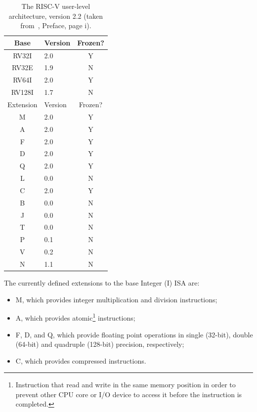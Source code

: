 \begin{table}[!htb]
\renewcommand{\arraystretch}{1.2} %
\caption{The RISC-V user-level architecture, version 2.2 (taken from~\cite{bib:riscvmanual}, Preface, page i).}
	\centering
	\small
	\begin{tabular}{clc}
		\toprule
		Base     & Version & Frozen? \\
		\midrule
		RV32I    & 2.0 & Y \\
		RV32E    & 1.9 & N \\
		RV64I    & 2.0 & Y \\
		RV128I   & 1.7 & N \\
		\midrule
		Extension & Version & Frozen? \\
		\midrule
		M        & 2.0 & Y \\
		A        & 2.0 & Y \\
		F        & 2.0 & Y \\
		D        & 2.0 & Y \\
		Q        & 2.0 & Y \\
		L        & 0.0 & N \\
		C        & 2.0 & Y \\
		B        & 0.0 & N \\
		J        & 0.0 & N \\
		T        & 0.0 & N \\
		P        & 0.1 & N \\
		V        & 0.2 & N \\
		N        & 1.1 & N \\
		\bottomrule
	\end{tabular}
	\label{table:isa}
\end{table}

The currently defined extensions to the base Integer (I) ISA are:

\begin{itemize}
\item M, which provides integer multiplication and division instructions;
\item A, which provides atomic\footnote{Instruction that read and write in the
  same memory position in order to prevent other CPU core or I/O device to
  access it before the instruction is completed.} instructions;
\item F, D, and Q, which provide floating point operations in single (32-bit),
  double (64-bit) and quadruple (128-bit) precision, respectively;
\item C, which provides compressed instructions. 
\end{itemize}

